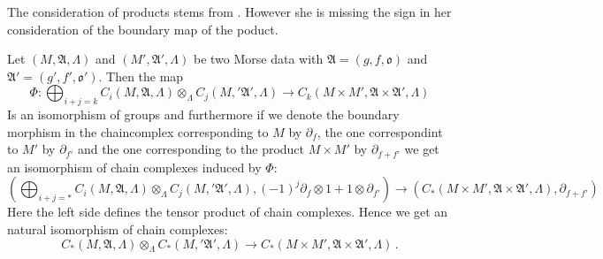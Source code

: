 	The consideration of products stems from \cite{AudinDamian2014}. However she is missing the sign in her consideration of the boundary map of the poduct. 
	\begin{remark}
			Let $(M,\mathfrak{A},\Lambda)$ and $(M',\mathfrak{A}',\Lambda)$ be two Morse data with $\mathfrak{A}=(g,f,\mathfrak{o})$ and $ \mathfrak{A}'=(g',f',\mathfrak{o}')$. Then the map
		\begin{equation*}
			\Phi: \bigoplus_{i+j=k}C_i(M,\mathfrak{A},\Lambda)\otimes_\Lambda C_j(M,'\mathfrak{A}',\Lambda) \to C_k(M\times M',\mathfrak{A}\times \mathfrak{A}',\Lambda)
		\end{equation*}
		Is an isomorphism of groups and furthermore if we denote the boundary morphism in the chaincomplex corresponding to $M$ by $\partial_f$, the one correspondint to $M'$ by $\partial_{f'}$ and the one corresponding to the product $M\times M'$ by $\partial_{f+f'}$ we	
		 get an  isomorphism of chain complexes induced by $\Phi$:
		\begin{equation*}
			\left(\bigoplus_{i+j=*}C_i(M,\mathfrak{A},\Lambda)\otimes_\Lambda C_j(M,'\mathfrak{A}',\Lambda),(-1)^j\partial_f\otimes 1 +1\otimes \partial_{f'} \right)
			\to 
			\left(C_*(M\times M',\mathfrak{A}\times \mathfrak{A}',\Lambda),\partial_{f+f'}\right)
		\end{equation*}
		Here the left side defines the tensor product of chain complexes. Hence we get an natural isomorphism of chain complexes:
		\begin{equation*}
			C_*(M,\mathfrak{A},\Lambda)\otimes_\Lambda C_*(M,'\mathfrak{A}',\Lambda) \to C_*(M\times M',\mathfrak{A}\times \mathfrak{A}',\Lambda) \,.
		\end{equation*}
	\end{remark}

